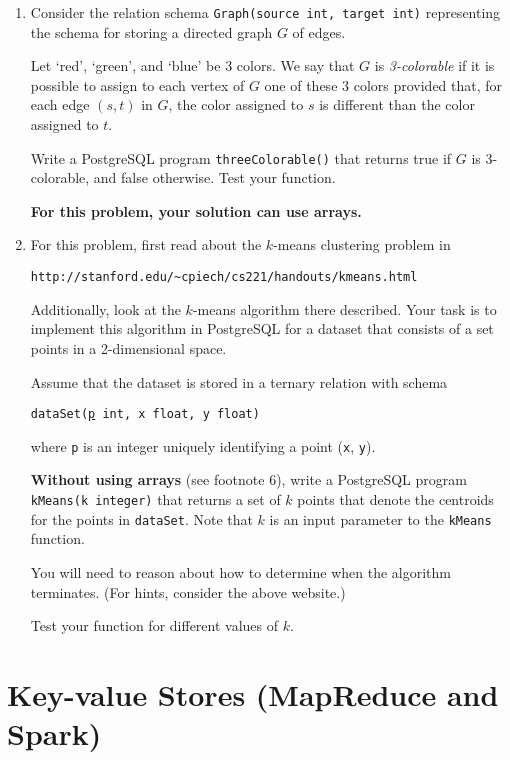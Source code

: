 \documentclass[10pt]{article}
\newcommand{\blue}[1]{{\color{blue}#1}}
\begin{document}
\begin{enumerate}[resume]
\item Consider the relation schema {\tt Graph(source int, target int)}
representing the schema for storing a directed graph $G$ of
edges.

Let `red', `green', and `blue' be 3 colors.
We say that $G$ is \emph{3-colorable} if it is possible to assign to each vertex
of $G$ one of these 3 colors provided that, for each edge $(s,t)$ in $G$, the color
assigned to $s$ is different than the color assigned to $t$.

Write a PostgreSQL program {\tt threeColorable()} that returns true
if $G$ is 3-colorable, and false otherwise.   Test your function.

\blue{\bf For this problem, your solution can use arrays.}

\item  For this problem, first read about the 
$k$-means clustering problem in
\begin{verbatim}
http://stanford.edu/~cpiech/cs221/handouts/kmeans.html
\end{verbatim}
Additionally, look at the $k$-means algorithm there described.
Your task is to implement this algorithm in PostgreSQL for
a dataset that consists of a set points in a 2-dimensional space.

Assume that the dataset is stored in a ternary relation with schema
\begin{center}
{\tt dataSet(\underline{p} int, x float, y float)} 
\end{center}
where
{\tt p} is an integer uniquely identifying a point ({\tt x}, {\tt y}).

\blue{\bf Without using arrays} (see footnote 6), write a PostgreSQL program {\tt kMeans(k integer)} that returns
a set of $k$ points that denote the centroids for the points
in {\tt dataSet}.     Note that $k$ is an input parameter to
the {\tt kMeans} function.

You will need to reason about how to determine when the
algorithm terminates.   (For hints, consider the above website.)

Test your function for different values of $k$.


\end{enumerate}
\newpage



\section{Key-value Stores (MapReduce and Spark)}
\end{document}
